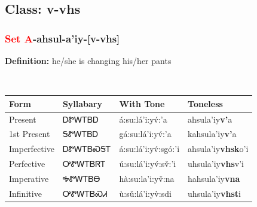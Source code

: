 \subsection*{Class: v-vhs}
\nopagebreak
\needspace{2in}
\subsubsection*{\textcolor{Red}{Set A}{-}\textbf{ahsul}{-}a'iy{-}[v-vhs]}
\nopagebreak
\textbf{Definition: } he/she is changing his/her pants
\\[0.5em]
\begin{tabularx}{\textwidth}{l X X X}%
\toprule%
\textbf{Form}&\textbf{Syllabary}&\textbf{With Tone}&\textbf{Toneless}\\%
\midrule%
Present&ᎠᏑᎳᎢᏴᎠ&á:su:lá’i:yv́:’a&ahsula'iy\textbf{v'}a\\%
1st Present&ᎦᏑᎳᎢᏴᎠ&gá:su:lá’i:yv́:’a&kahsula'iy\textbf{v'}a\\%
Imperfective&ᎠᏑᎳᎢᏴᏍᎦᎢ&á:su:lá’i:yv́:sgó:’i&ahsula'iy\textbf{vhsk}o'i\\%
Perfective&ᎤᏑᎳᎢᏴᏒᎢ&ú:su:lá’i:yv́:sv̌:’i&uhsula'iy\textbf{vhs}v'i\\%
Imperative&ᎭᏑᎳᎢᏴᎾ&hà:su:la’i:yv̌:na&hahsula'iy\textbf{vna}\\%
Infinitive&ᎤᏑᎳᎢᏴᏍᏗ&ù:sǔ:lá’i:yv̀:sdi&uhsula'iy\textbf{vhst}i\\%
\bottomrule%
\end{tabularx}
\\[1em]